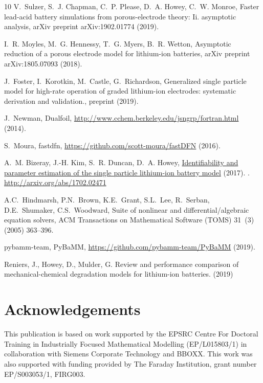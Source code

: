 \documentclass[a4paper]{article}
\begin{document}
\begin{thebibliography}{10}
    V.~Sulzer, S.~J. Chapman, C.~P. Please, D.~A. Howey, C.~W. Monroe, Faster
      lead-acid battery simulations from porous-electrode theory: Ii. asymptotic
      analysis, arXiv preprint arXiv:1902.01774 (2019).
    
    I.~R. Moyles, M.~G. Hennessy, T.~G. Myers, B.~R. Wetton, Asymptotic reduction
      of a porous electrode model for lithium-ion batteries, arXiv preprint
      arXiv:1805.07093 (2018).
    
    J.~Foster, I.~Korotkin, M.~Castle, G.~Richardson, Generalized single particle
      model for high-rate operation of graded lithium-ion electrodes: systematic
      derivation and validation., preprint (2019).
    
    J.~Newman, Dualfoil, \url{http://www.cchem.berkeley.edu/jsngrp/fortran.html}
      (2014).
    
    S.~Moura, fastdfn, \url{https://github.com/scott-moura/fastDFN} (2016).
    
    A.~M. Bizeray, J.-H. Kim, S.~R. Duncan, D.~A. Howey,
      \href{http://arxiv.org/abs/1702.02471}{{Identifiability and parameter
      estimation of the single particle lithium-ion battery model}} (2017).
    \newblock \href {http://arxiv.org/abs/1702.02471} {}.
    \newline\urlprefix\url{http://arxiv.org/abs/1702.02471}

    A.C.~Hindmarsh, P.N.~Brown, K.E.~Grant, S.L.~Lee, R.~Serban, D.E.~Shumaker, C.S.~Woodward, Suite of nonlinear and differential/algebraic equation solvers, ACM Transactions on Mathematical Software (TOMS) 31~(3) (2005) 363--396. 

    pybamm-team, PyBaMM, \url{https://github.com/pybamm-team/PyBaMM} (2019).

    Reniers, J., Howey, D., Mulder, G. Review and performance comparison of mechanical-chemical degradation models for lithium-ion batteries. (2019)
    
\end{thebibliography}

\newpage

\section*{Acknowledgements}
This publication is based on work supported by the EPSRC Centre For Doctoral Training in Industrially Focused Mathematical Modelling (EP/L015803/1) in collaboration with Siemens Corporate Technology and BBOXX. This work was also supported with funding provided by The Faraday Institution, grant number EP/S003053/1, FIRG003.
\end{document}
